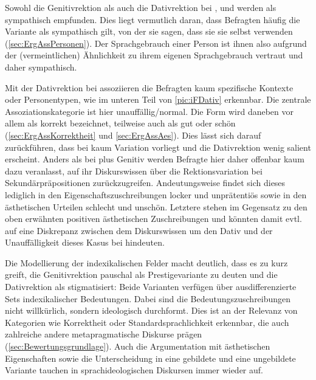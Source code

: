 Sowohl die Genitivrektion als auch die Dativrektion bei \wegen, \waehrend{} und \dank{} werden als sympathisch empfunden. 
Dies liegt vermutlich daran, dass Befragten häufig die Variante als sympathisch gilt, von der sie sagen, dass sie sie selbst verwenden (\autoref{sec:ErgAssPersonen}). 
Der Sprachgebrauch einer Person ist ihnen also aufgrund der (vermeintlichen) Ähnlichkeit zu ihrem eigenen Sprachgebrauch vertraut und daher sympathisch.  

Mit der Dativrektion bei \gegenueber{} assoziieren die Befragten kaum spezifische Kontexte oder Personentypen, wie im unteren Teil von \autoref{pic:iFDativ} erkennbar.
Die zentrale Assoziationskategorie ist hier \glqq unauffällig/normal\grqq. 
Die Form wird daneben vor allem als korrekt bezeichnet, teilweise auch als gut oder schön (\autoref{sec:ErgAssKorrektheit} und \autoref{sec:ErgAssAes}). 
Dies lässt sich darauf zurückführen, dass bei \gegenueber{} kaum Variation vorliegt und die Dativrektion wenig salient erscheint. 
Anders als bei \gegenueber{} plus Genitiv werden Befragte hier daher offenbar kaum dazu veranlasst, auf ihr Diskurswissen über die Rektionsvariation bei Sekundärpräpositionen zurückzugreifen.  
Andeutungsweise findet sich dieses lediglich in den Eigenschaftszuschreibungen locker und unprätentiös sowie in den ästhetischen Urteilen schlecht und unschön. 
Letztere stehen im Gegensatz zu den oben erwähnten positiven ästhetischen Zuschreibungen und könnten damit evtl. auf eine Diskrepanz zwischen dem Diskurswissen um den Dativ und der Unauffälligkeit dieses Kasus bei \gegenueber{} hindeuten. 

Die Modellierung der indexikalischen Felder macht deutlich, dass es zu kurz greift, die Genitivrektion pauschal als Prestigevariante zu deuten und die Dativrektion als stigmatisiert: 
Beide Varianten verfügen über ausdifferenzierte Sets indexikalischer Bedeutungen. 
Dabei sind die Bedeutungszuschreibungen nicht willkürlich, sondern ideologisch durchformt.
Dies ist an der Relevanz von Kategorien wie Korrektheit oder Standardsprachlichkeit erkennbar, die auch zahlreiche andere metapragmatische Diskurse prägen (\autoref{sec:Bewertungsgrundlage}). 
Auch die Argumentation mit ästhetischen Eigenschaften sowie die Unterscheidung in eine gebildete und eine ungebildete Variante tauchen in sprachideologischen Diskursen immer wieder auf. 


